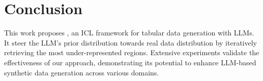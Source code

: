\section{Conclusion}
This work proposes \modelname, an ICL framework for tabular data generation with LLMs. It steer the LLM's prior distribution towards real data distribution by iteratively retrieving the most under-represented regions. Extensive experiments validate the effectiveness of our approach, demonstrating its potential to enhance LLM-based synthetic data generation across various domains.

